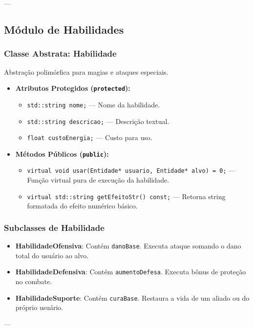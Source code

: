 \documentclass[12pt,a4paper]{article}
\begin{document}
---

\subsection{Módulo de Habilidades}

\subsubsection{Classe Abstrata: Habilidade}
Abstração polimórfica para magias e ataques especiais.
\begin{itemize}
    \item \textbf{Atributos Protegidos (\texttt{protected}):}
    \begin{itemize}
        \item \texttt{std::string nome;} --- Nome da habilidade.
        \item \texttt{std::string descricao;} --- Descrição textual.
        \item \texttt{float custoEnergia;} --- Custo para uso.
    \end{itemize}
    \item \textbf{Métodos Públicos (\texttt{public}):}
    \begin{itemize}
        \item \texttt{virtual void usar(Entidade* usuario, Entidade* alvo) = 0;} --- Função virtual pura de execução da habilidade.
        \item \texttt{virtual std::string getEfeitoStr() const;} --- Retorna string formatada do efeito numérico básico.
    \end{itemize}
\end{itemize}

\subsubsection{Subclasses de Habilidade}
\begin{itemize}
    \item \textbf{HabilidadeOfensiva}: Contém \texttt{danoBase}. Executa ataque somando o dano total do usuário ao alvo.
    \item \textbf{HabilidadeDefensiva}: Contém \texttt{aumentoDefesa}. Executa bônus de proteção no combate.
    \item \textbf{HabilidadeSuporte}: Contém \texttt{curaBase}. Restaura a vida de um aliado ou do próprio usuário.
\end{itemize}

---
\end{document}
